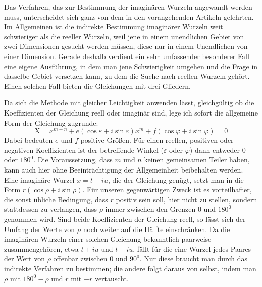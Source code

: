 Das Verfahren, das zur Bestimmung der imaginären Wurzeln angewandt werden muss, unterscheidet sich ganz von dem in den vorangehenden Artikeln gelehrten. Im Allgemeinen ist die indirekte Bestimmung imaginärer Wurzeln weit schwieriger als die reeller Wurzeln, weil jene in einem unendlichen Gebiet von zwei Dimensionen gesucht werden müssen, diese nur in einem Unendlichen von einer Dimension. Gerade deshalb verdient ein sehr umfassender besonderer Fall eine eigene Ausführung, in dem man jene Schwierigkeit umgehen und die Frage in dasselbe Gebiet versetzen kann, zu dem die Suche nach reellen Wurzeln gehört. Einen solchen Fall bieten die Gleichungen mit drei Gliedern.

Da sich die Methode mit gleicher Leichtigkeit anwenden lässt, gleichgültig ob die Koeffizienten der Gleichung reell oder imaginär sind, lege ich sofort die allgemeine Form der Gleichung zugrunde:
\[
\mathrm{X}=x^{m+n}+e(\cos\varepsilon+i\sin\varepsilon)x^m+f(\cos\varphi+i\sin\varphi)=0
\]
Dabei bedeuten $e$ und $f$ positive Größen. Für einen reellen, positiven oder negativen Koeffizienten ist der betreffende Winkel ($\varepsilon$ oder $\varphi$) dann entweder $0$ oder $180^{0}$. Die Voraussetzung, dass $m$ und $n$ keinen gemeinsamen Teiler haben, kann auch hier ohne Beeinträchtigung der Allgemeinheit beibehalten werden. Eine imaginäre Wurzel $x=t+iu$, die der Gleichung genügt, setzt man in die Form $r(\cos\rho+i\sin\rho)$. Für unseren gegenwärtigen Zweck ist es
vorteilhafter, die sonst übliche Bedingung, dass $r$ positiv sein soll, hier nicht zu stellen, sondern stattdessen zu verlangen, dass $\rho$ immer zwischen den Grenzen $0$ und $180^{0}$ genommen wird. Sind beide Koeffizienten der Gleichung reell, so lässt sich der Umfang der Werte von $\rho$ noch weiter auf die Hälfte einschränken. Da die imaginären Wurzeln einer solchen Gleichung bekanntlich paarweise zusammengehören, etwa $t+iu$ und $t-iu$, fällt für die eine Wurzel jedes Paares der Wert von $\rho$ offenbar zwischen $0$ und $90^{0}$. Nur diese braucht man durch das indirekte Verfahren zu bestimmen; die andere folgt daraus von selbst, indem man $\rho$ mit $180^{0}-\rho$ und $r$ mit $-r$ vertauscht.

